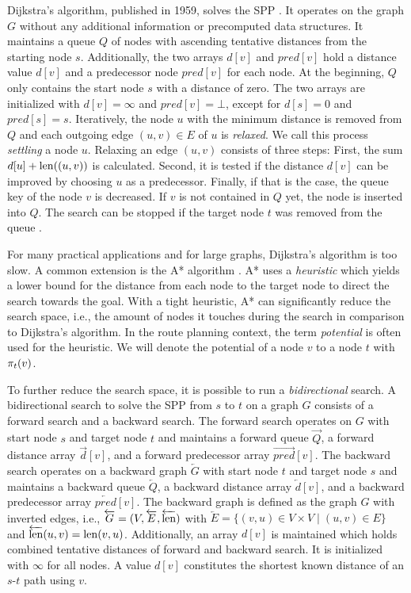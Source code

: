 Dijkstra's algorithm, published in 1959, solves the SPP \cite{dijkstra:1959}. It operates on the graph $G$ without any additional information or precomputed data structures. It maintains a queue $Q$ of nodes with ascending tentative distances from the starting node $s$. Additionally, the two arrays $d[v]$ and $pred[v]$ hold a distance value $d[v]$ and a predecessor node $pred[v]$ for each node. At the beginning, $Q$ only contains the start node $s$ with a distance of zero. The two arrays are initialized with $d[v]=\infty$ and $pred[v]=\bot$, except for $d[s]=0$ and $pred[s]=s$. Iteratively, the node $u$ with the minimum distance is removed from $Q$ and each outgoing edge $(u,v) \in E$ of $u$ is \emph{relaxed}. We call this process \emph{settling} a node $u$. Relaxing an edge $(u,v)$ consists of three steps: First, the sum $d[u] + \operatorname{len}((u,v))$ is calculated. Second, it is tested if the distance $d[v]$ can be improved by choosing $u$ as a predecessor. Finally, if that is the case, the queue key of the node $v$ is decreased. If $v$ is not contained in $Q$ yet, the node is inserted into $Q$. The search can be stopped if the target node $t$ was removed from the queue \cite{dijkstra:1959}.

For many practical applications and for large graphs, Dijkstra's algorithm is too slow. A common extension is the A* algorithm \cite{hart:1968}. A* uses a \emph{heuristic} which yields a lower bound for the distance from each node to the target node to direct the search towards the goal. With a tight heuristic, A* can significantly reduce the search space, i.e., the amount of nodes it touches during the search in comparison to Dijkstra's algorithm. In the route planning context, the term \emph{potential} is often used for the heuristic. We will denote the potential of a node $v$ to a node $t$ with $\pi_t(v)$.

To further reduce the search space, it is possible to run a \emph{bidirectional} search. A bidirectional search to solve the SPP from $s$ to $t$ on a graph $G$ consists of a forward search and a backward search. The forward search operates on $G$ with start node $s$ and target node $t$ and maintains a forward queue $\overrightarrow{Q}$, a forward distance array $\overrightarrow{d}[v]$, and a forward predecessor array $\overrightarrow{pred}[v]$. The backward search operates on a backward graph $\overleftarrow{G}$ with start node $t$ and target node $s$ and maintains a backward queue $\overleftarrow{Q}$, a backward distance array $\overleftarrow{d}[v]$, and a backward predecessor array $\overleftarrow{pred}[v]$. The backward graph is defined as the graph $G$ with inverted edges, i.e., $\overleftarrow{G} = (V,\overleftarrow{E},\overleftarrow{\operatorname{len}})$ with $\overleftarrow{E} = \{(v,u) \in V \times V \mid (u,v) \in E\}$ and $\overleftarrow{\operatorname{len}}(u,v) = \operatorname{len}(v,u)$. Additionally, an array $d[v]$ is maintained which holds combined tentative distances of forward and backward search. It is initialized with $\infty$ for all nodes. A value $d[v]$ constitutes the shortest known distance of an $s$-$t$ path using $v$.

